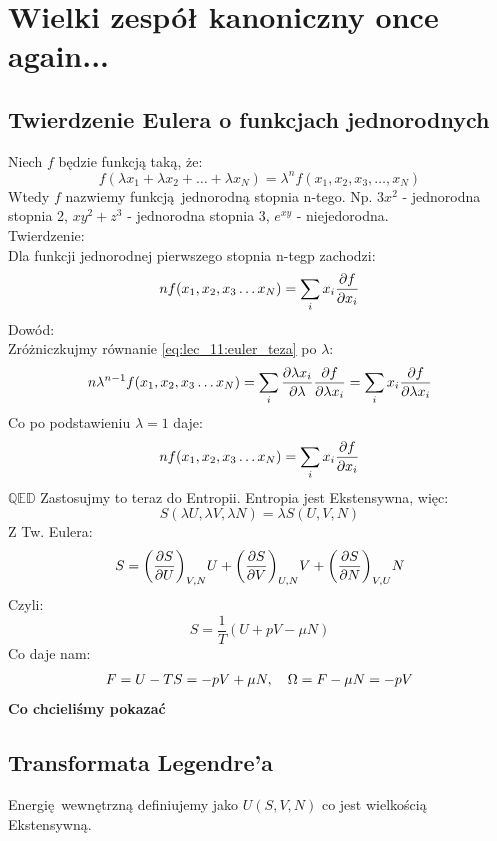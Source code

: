 \documentclass[12pt,a4paper]{report}
\renewcommand{\emph}{\textbf}
\newenvironment{lecture}[1]{\par\medskip
   \noindent\chapter{#1} \rmfamily}{\medskip}
\begin{document}
\begin{lecture}{Wielki zespół kanoniczny once again...}
\section{Twierdzenie Eulera o funkcjach jednorodnych}
Niech $f$ będzie funkcją taką, że:
\begin{equation}
    f(\lambda x_1 + \lambda x_2 + \dots + \lambda x_N) = \lambda^n f(x_1, x_2, x_3, \dots, x_N)
    \label{eq:lec_11:euler_teza}
\end{equation}
Wtedy $f$ nazwiemy funkcją jednorodną stopnia n-tego. Np. $3x^2$ - jednorodna stopnia 2, $xy^2+z^3$ - jednorodna stopnia 3, $e^{xy}$ - niejedorodna.\\
Twierdzenie:\\
Dla funkcji jednorodnej pierwszego stopnia n-tegp zachodzi:
\[
    nf(x_1, x_2, x_3 \dots x_N) = \sum_i x_i \pdv{f}{x_i}
\]
Dowód:\\
Zróżniczkujmy równanie \eqref{eq:lec_11:euler_teza} po $\lambda$:
\[
    n \lambda^{n-1}f(x_1, x_2, x_3 \dots x_N) = \sum_i \pdv{\lambda x_i}{\lambda} \pdv{f}{\lambda x_i} = \sum_i x_i \pdv{f}{\lambda x_i}
\]
Co po podstawieniu $\lambda = 1$ daje:
\[
    nf(x_1, x_2, x_3 \dots x_N) = \sum_i x_i \pdv{f}{x_i}
\]
$\mathbb{QED}$
Zastosujmy to teraz do Entropii. Entropia jest Ekstensywna, więc:
\[
    S(\lambda U, \lambda V, \lambda N) = \lambda S(U, V, N)
\]
Z Tw. Eulera:
\[
    S = \qty(\pdv{S}{U})_{V, N} U + \qty(\pdv{S}{V})_{U, N} V + \qty(\pdv{S}{N})_{V, U} N
\]
Czyli:
\[
    S = \frac{1}{T} (U + pV - \mu N)
\]
Co daje nam:
\[
    F = U - TS = - p V + \mu N \qc \Omega = F - \mu N = - pV
\]
\emph{Co chcieliśmy pokazać}


\section{Transformata Legendre'a}
Energię wewnętrzną definiujemy jako $U(S, V, N)$ co jest wielkością Ekstensywną.


\end{lecture}
\end{document}
